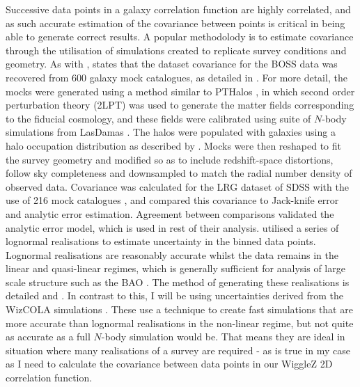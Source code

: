 \documentclass[titlesmallcaps, examinerscopy, copyrightpage]{uqthesis}
\begin{document}
Successive data points in a galaxy correlation function are highly correlated, and as such accurate estimation of the covariance between points is critical in being able to generate correct results. A popular methodolody is to estimate covariance through the utilisation of simulations created to replicate survey conditions and geometry. As with \citet{SanchezScoccola2012}, \citet{AndersonAubourg2012} states that the dataset covariance for the BOSS data was recovered from 600 galaxy mock catalogues, as detailed in \citet{ManeraScoccimarro2013}. For more detail, the mocks were generated using a method similar to PTHalos \citep{ScoccimarroSheth2002}, in which second order perturbation theory (2LPT) was used to generate the matter fields corresponding to the fiducial cosmology, and these fields were calibrated using suite of $N$-body simulations from LasDamas \citep{McBride2011}. The halos were populated with galaxies using a halo occupation distribution as described by \citet{ZhengCoilZehavi2007}. Mocks were then reshaped to fit the survey geometry and modified so as to include redshift-space distortions, follow sky completeness and downsampled to match the radial number density of observed data. Covariance was calculated for the LRG dataset of SDSS with the use of 216 mock catalogues \citep[MICEL7860; see][for details]{FosalbaGaztanaga2008, CrocceFosalbaCastander2010}, and \citet{Gaztanaga2009} compared this covariance to Jack-knife error and analytic error estimation. Agreement between comparisons validated the analytic error model, which is used in rest of their analysis. \citet{BlakeDavis2011} utilised a series of lognormal realisations to estimate uncertainty in the binned data points. Lognormal realisations are reasonably accurate whilst the data remains in the linear and quasi-linear regimes, which is generally sufficient for analysis of large scale structure such as the BAO \citep{ColesJones1991}. The method of generating these realisations is detailed \citet{BlakeGlazebrook2003} and \citet{GlazebrookBlake2005}. In contrast to this, I will be using uncertainties derived from the WizCOLA simulations \citep{KodaBlake2015}. These use a technique to create fast simulations that are more accurate than lognormal realisations in the non-linear regime, but not quite as accurate as a full $N$-body simulation would be. That means they are ideal in situation where many realisations of a survey are required - as is true in my case as I need to calculate the covariance between data points in our WiggleZ 2D correlation function.
\end{document}
